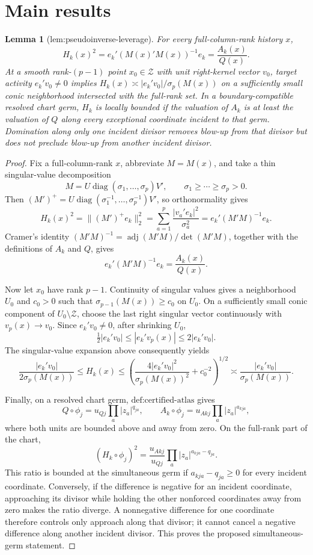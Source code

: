 \documentclass{article}
\newtheorem{lemma}{Lemma}
\begin{document}
\section{Main results}

\begin{lemma}[lem:pseudoinverse-leverage]\label{lem:pseudoinverse-leverage}
For every full-column-rank history \(x\), \[H_k(x)^2=e_k'(M(x)'M(x))^{-1}e_k=\frac{A_k(x)}{Q(x)}.\] At a smooth rank-\((p-1)\) point \(x_0\in\mathcal Z\) with unit right-kernel vector \(v_0\), target activity \(e_k'v_0\ne0\) implies \(H_k(x)\asymp |e_k'v_0|/\sigma_p(M(x))\) on a sufficiently small conic neighborhood intersected with the full-rank set. In a boundary-compatible resolved chart germ, \(H_k\) is locally bounded if the valuation of \(A_k\) is at least the valuation of \(Q\) along every exceptional coordinate incident to that germ. Domination along only one incident divisor removes blow-up from that divisor but does not preclude blow-up from another incident divisor.
\end{lemma}
\begin{proof}
Fix a full-column-rank \(x\), abbreviate \(M=M(x)\), and take a thin singular-value decomposition
\[
M=U\operatorname{diag}(\sigma _1,\ldots,\sigma _p)V',
\qquad \sigma _1\ge\cdots\ge\sigma _p>0.
\]
Then \((M')^+=U\operatorname{diag}(\sigma _1^{-1},\ldots,\sigma _p^{-1})V'\), so orthonormality gives
\[
H_k(x)^2=\|(M')^+e_k\|_2^2
=\sum_{a=1}^p\frac{|v_a'e_k|^2}{\sigma _a^2}
=e_k'(M'M)^{-1}e_k.
\]
Cramer's identity \((M'M)^{-1}=\operatorname{adj}(M'M)/\det(M'M)\), together with the definitions of \(A_k\) and \(Q\), gives
\[
e_k'(M'M)^{-1}e_k=\frac{A_k(x)}{Q(x)}.
\]

Now let \(x_0\) have rank \(p-1\). Continuity of singular values gives a neighborhood \(U_0\) and \(c_0>0\) such that \(\sigma_{p-1}(M(x))\ge c_0\) on \(U_0\). On a sufficiently small conic component of \(U_0\setminus\mathcal Z\), choose the last right singular vector continuously with \(v_p(x)\to v_0\). Since \(e_k'v_0\ne0\), after shrinking \(U_0\),
\[
\tfrac12|e_k'v_0|\le |e_k'v_p(x)|\le 2|e_k'v_0|.
\]
The singular-value expansion above consequently yields
\[
\frac{|e_k'v_0|}{2\sigma_p(M(x))}
\le H_k(x)
\le \left(\frac{4|e_k'v_0|^2}{\sigma_p(M(x))^2}+c_0^{-2}\right)^{1/2}
\asymp \frac{|e_k'v_0|}{\sigma_p(M(x))}.
\]

Finally, on a resolved chart germ, \(\text{def:certified-atlas}\) gives
\[
Q\circ\phi_j=u_{Qj}\prod_a|z_a|^{q_{ja}},
\qquad
A_k\circ\phi_j=u_{Akj}\prod_a|z_a|^{a_{kja}},
\]
where both units are bounded above and away from zero. On the full-rank part of the chart,
\[
(H_k\circ\phi_j)^2
=\frac{u_{Akj}}{u_{Qj}}\prod_a|z_a|^{a_{kja}-q_{ja}}.
\]
This ratio is bounded at the simultaneous germ if \(a_{kja}-q_{ja}\ge0\) for every incident coordinate. Conversely, if the difference is negative for an incident coordinate, approaching its divisor while holding the other nonforced coordinates away from zero makes the ratio diverge. A nonnegative difference for one coordinate therefore controls only approach along that divisor; it cannot cancel a negative difference along another incident divisor. This proves the proposed simultaneous-germ statement.
\end{proof}
\end{document}

